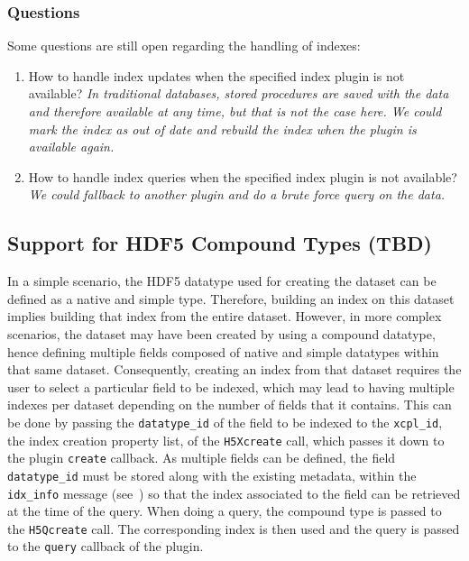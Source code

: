 \subsubsection*{Questions}
Some questions are still open regarding the handling of indexes:
\begin{enumerate}
\item How to handle index updates when the specified index plugin is not available?
\textit{In traditional databases, stored procedures are saved with the data and
therefore available at any time, but that is not the case here.
We could mark the index as out of date and rebuild the index when the plugin is
available again.}
\item How to handle index queries when the specified index plugin is not
available? \textit{We could fallback to another plugin and do a brute force query on the data.}
\end{enumerate}

\subsection{Support for HDF5 Compound Types (TBD)}

In a simple scenario, the HDF5 datatype used for creating the dataset can be defined
as a native and simple type. Therefore, building an index on this dataset implies
building that index from the entire dataset. However, in more complex scenarios, the
dataset may have been created by using a compound datatype, hence defining
multiple fields composed of native and simple datatypes within that same dataset.
Consequently, creating an index from that dataset requires the user to select a
particular field to be indexed, which may lead to having multiple indexes per dataset
depending on the number of fields that it contains. This can be done by passing
the \texttt{datatype\_id} of the field to be indexed to the \texttt{xcpl\_id},
the index creation property list, of the \texttt{H5Xcreate} call, which passes
it down to the plugin \texttt{create} callback. As multiple fields can be defined,
the field \texttt{datatype\_id} must be stored along with the existing metadata, within the
\texttt{idx\_info} message (see~) so that the index
associated to the field can be retrieved at the time of the query.
When doing a query, the compound type is passed to the \texttt{H5Qcreate} call.
The corresponding index is then used and the query is passed to the \texttt{query}
callback of the plugin.

